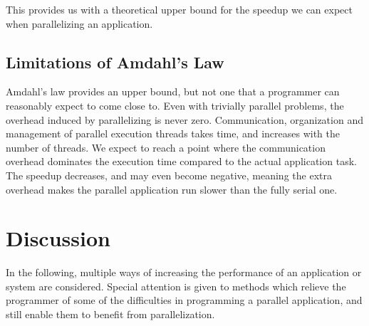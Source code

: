 \documentclass[BCOR20mm,DIV14,10pt,headinclude,footexclude,bibtotoc,liststotoc]{article}
\begin{document}
\begin{figure}
	\centering
	\caption{}
	\label{fig:amdahl}
\end{figure}

This provides us with a theoretical upper bound for the speedup we can expect
when parallelizing an application.


\subsection{Limitations of Amdahl's Law}
Amdahl's law provides an upper bound, but not one that a programmer can
reasonably expect to come close to. Even with trivially parallel problems, the
overhead induced by parallelizing is never zero. Communication, organization and
management of parallel execution threads takes time, and increases with the
number of threads. We expect to reach a point where the communication overhead
dominates the execution time compared to the actual application task. The
speedup decreases, and may even become negative, meaning the extra overhead
makes the parallel application run slower than the fully serial one.


\section{Discussion}
In the following, multiple ways of increasing the performance of an application
or system are considered. Special attention is given to methods which relieve
the programmer of some of the difficulties in programming a parallel
application, and still enable them to benefit from parallelization.


\end{document}
